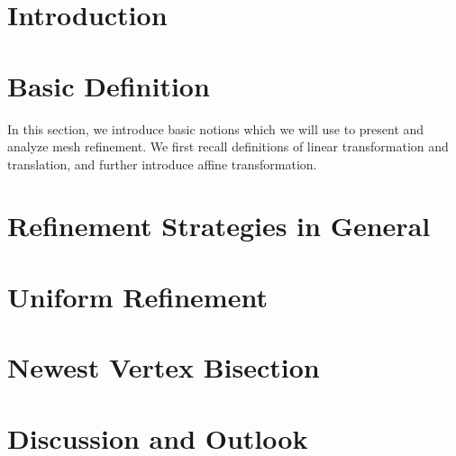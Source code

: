 \documentclass[english]{article}
\begin{document}
  

  \section{Introduction}
  

  \section{Basic Definition}
    In this section, we introduce basic notions which we will use to present and analyze mesh refinement.
    We first recall definitions of linear transformation and translation, and further introduce affine transformation.

    
    
    
    


  \section{Refinement Strategies in General}
    

  \section{Uniform Refinement}
    

  \section{Newest Vertex Bisection}
    

  \section{Discussion and Outlook}
    

  \newpage
  
  
    
\end{document}
